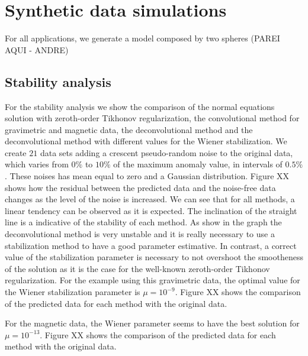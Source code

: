 \section{Synthetic data simulations}
\label{sec:synthetic_simulations}

For all applications, we generate a model composed by two spheres (PAREI AQUI - ANDRE)

\subsection{Stability analysis}

For the stability analysis we show the comparison of the normal equations solution with zeroth-order Tikhonov regularization, the convolutional method for gravimetric and magnetic data, the deconvolutional method and the deconvolutional method with different values for the Wiener stabilization. We create $21$ data sets adding a crescent pseudo-random noise to the original data, which varies from $0\%$ to $10\%$ of the maximum anomaly value, in intervals of $0.5\%$. These noises has mean equal to zero and a Gaussian distribution.
Figure XX shows how the residual between the predicted data and the noise-free data changes as the level of the noise is increased. We can see that for all methods, a linear tendency can be observed as it is expected. The inclination of the straight line is a indicative of the stability of each method. As show in the graph the deconvolutional method is very unstable and it is really necessary to use a stabilization method to have a good parameter estimative. In contrast, a correct value of the stabilization parameter is necessary to not overshoot the smootheness of the solution as it is the case for the well-known zeroth-order Tikhonov regularization. For the example using this gravimetric data, the optimal value for the Wiener stabilization parameter is $\mu = 10^{-9}$. Figure XX shows the comparison of the predicted data for each method with the original data.

For the magnetic data, the Wiener parameter seems to have the best solution for $\mu = 10^{-13}$. Figure XX shows the comparison of the predicted data for each method with the original data.
